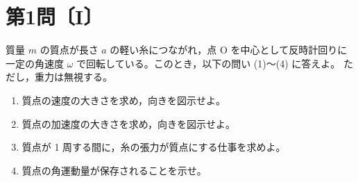 \section*{第1問〔I〕}

質量 $m$ の質点が長さ $a$ の軽い糸につながれ，点 O を中心として反時計回りに
一定の角速度 $\omega$ で回転している。このとき，以下の問い (1)〜(4) に答えよ。
ただし，重力は無視する。

\begin{enumerate}[label=(\arabic*)]
  \item 質点の速度の大きさを求め，向きを図示せよ。
  \item 質点の加速度の大きさを求め，向きを図示せよ。
  \item 質点が 1 周する間に，糸の張力が質点にする仕事を求めよ。
  \item 質点の角運動量が保存されることを示せ。
\end{enumerate}
